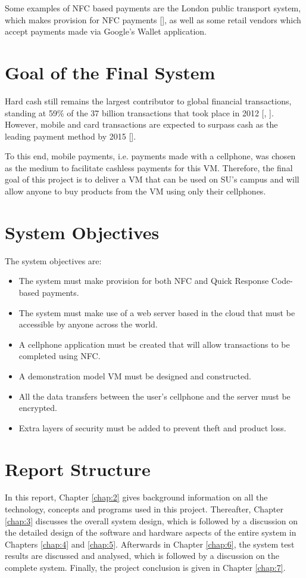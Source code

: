 Some examples of NFC based payments are the London public transport system, which makes
provision for NFC payments [\cite{article:nfc-underground}], as well as some retail vendors
which accept payments made via Google's Wallet application.

\section{Goal of the Final System}
\label{sec:final-system-goal}

Hard cash still remains the largest contributor to global financial transactions,
standing at 59\% of the 37 billion transactions that took place in 2012
[\cite{article:money-transactions}, \cite{website:money-transactions}]. However,
mobile and card transactions are expected to surpass cash as the leading
payment method by 2015 [\cite{article:cashless-transactions}].

To this end, mobile payments, i.e. payments made with a cellphone, was chosen
as the medium to facilitate cashless payments for this VM.
Therefore, the final goal of this project is to deliver a VM
that can be used on SU's campus and will allow anyone to buy products from
the VM using only their cellphones.

\section{System Objectives}
\label{sec:objectives}

The system objectives are:

\begin{itemize}
  \item The system must make provision for both NFC and Quick Response Code-based payments.
  \item The system must make use of a web server based in the cloud that must be accessible by anyone across the world.
  \item A cellphone application must be created that will allow transactions to be
  completed using NFC.
  \item A demonstration model VM must be designed and constructed.
  \item All the data transfers between the user's cellphone and the server must be
  encrypted.
  \item Extra layers of security must be added to prevent theft and product
  loss.
\end{itemize}

\section{Report Structure}

In this report, Chapter \ref{chap:2} gives background information on all the
technology, concepts and programs used in this project. Thereafter, Chapter
\ref{chap:3} discusses the overall system design, which is followed by
a discussion on the detailed design of the software and hardware aspects of the
entire system in Chapters \ref{chap:4} and \ref{chap:5}. Afterwards in
Chapter \ref{chap:6}, the system test results are discussed and analysed,
which is followed by a discussion on the complete system. Finally, the project conclusion
is given in Chapter \ref{chap:7}.
